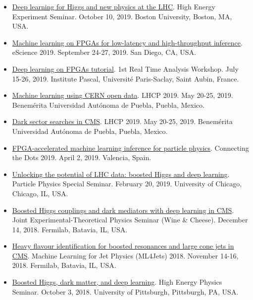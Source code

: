 \documentclass[11pt]{res}
\begin{document}
\begin{resume}
\begin{itemize}
    \item \href{http://physics.bu.edu/events/show/2204}{Deep learning for Higgs and new physics at the LHC}. High Energy Experiment Seminar. October 10, 2019. Boston University, Boston, MA, USA.
    \item \href{https://escience2019.sdsc.edu/program}{Machine learning on FPGAs for low-latency and high-throughput inference}. eScience 2019. September 24-27, 2019. San Diego, CA, USA.
    \item \href{https://indico.cern.ch/event/793125/contributions/3495251/}{Deep learning on FPGAs tutorial}. 1st Real Time Analysis Workshop. July 15-26, 2019. Institute Pascal, Universit\'{e} Paris-Saclay, Saint Aubin, France.
    \item \href{https://indico.cern.ch/event/687651/contributions/3428206/}{Machine learning using CERN open data}. LHCP 2019. May 20-25, 2019. Benem\'{e}rita Universidad Aut\'{o}noma de Puebla, Puebla, Mexico.
    \item \href{https://indico.cern.ch/event/687651/contributions/3426898/}{Dark sector searches in CMS}. LHCP 2019. May 20-25, 2019. Benem\'{e}rita Universidad Aut\'{o}noma de Puebla, Puebla, Mexico.
    \item \href{https://indico.cern.ch/event/742793/contributions/3274392/}{FPGA-accelerated machine learning inference for particle physics}. Connecting the Dots 2019. April 2, 2019. Valencia, Spain.
    \item \href{https://universityofchicago.hosted.panopto.com/Panopto/Pages/Viewer.aspx?id=66ca09d7-74c1-4b12-bb57-a9fa01046cdf}{Unlocking the potential of LHC data: boosted Higgs and deep learning}. Particle Physics Special Seminar. February 20, 2019. University of Chicago, Chicago, IL, USA.
    \item \href{http://theory.fnal.gov/events/event/results-from-cms-18/}{Boosted Higgs couplings and dark mediators with deep learning in CMS}. Joint Experimental-Theoretical Physics Seminar (Wine \& Cheese). December 14, 2018. Fermilab, Batavia, IL, USA.
    \item \href{https://indico.cern.ch/event/745718/contributions/3211982/}{Heavy flavour identification for boosted resonances and large cone jets in CMS}. Machine Learning for Jet Physics (ML4Jets) 2018. November 14-16, 2018. Fermilab, Batavia, IL, USA.
    \item \href{https://www.physicsandastronomy.pitt.edu/events/hep-seminar-javier-duarte-fermilab}{Boosted Higgs, dark matter, and deep learning}. High Energy Physics Seminar. October 3, 2018. University of Pittsburgh, Pittsburgh, PA, USA.

\end{itemize}
\end{resume}
\end{document}
